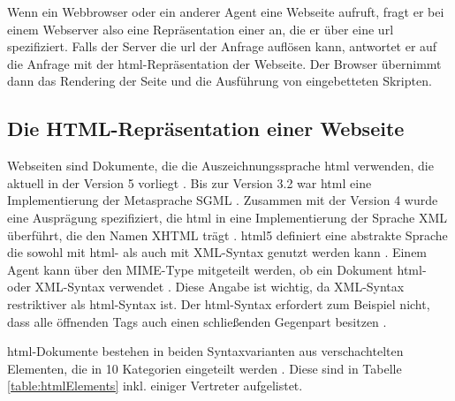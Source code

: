         Wenn ein Webbrowser oder ein anderer Agent eine Webseite aufruft,
        fragt er bei einem Webserver also eine Repräsentation
        einer {\resource} an, die er über eine \gls{url} spezifiziert.
        Falls der Server die \gls{url} der Anfrage auflösen kann,
        antwortet er auf die Anfrage mit der \acrshort{html}-Repräsentation der Webseite.
        Der Browser übernimmt dann das Rendering der Seite und die Ausführung
        von eingebetteten Skripten.

        \subsection{Die HTML-Repräsentation einer Webseite}
            Webseiten sind Dokumente, die die Auszeichnungssprache \gls{html} verwenden,
            die aktuell in der Version 5 vorliegt \cite{w3c:html5}.
            Bis zur Version 3.2 war \gls{html} eine Implementierung der Metasprache SGML \cite[Kapitel 3]{w3c:html401}.
            Zusammen mit der Version 4 wurde eine Ausprägung spezifiziert,
            die \gls{html} in eine Implementierung der Sprache XML überführt,
            die den Namen XHTML trägt \cite{w3c:xhtml}.
            \gls{html}5 definiert eine abstrakte Sprache
            die sowohl mit \gls{html}- als auch mit XML-Syntax genutzt werden kann
            \cite[Kapitel 1.6]{w3c:html5}.
            Einem Agent kann über den MIME-Type mitgeteilt werden,
            ob ein Dokument \gls{html}- oder XML-Syntax verwendet \cite[Kapitel 1.6]{w3c:html5}.
            Diese Angabe ist wichtig, da XML-Syntax restriktiver als \gls{html}-Syntax ist.
            Der \gls{html}-Syntax erfordert zum Beispiel nicht,
            dass alle öffnenden Tags auch einen schließenden Gegenpart besitzen
            \cite[Kapitel 3.2.3]{w3c:html5}.

            \gls{html}-Dokumente bestehen in beiden Syntaxvarianten aus verschachtelten
            Elementen, die in 10 Kategorien eingeteilt werden \cite[Kapitel 4]{w3c:html5}.
            Diese sind in Tabelle \ref{table:htmlElements} inkl. einiger Vertreter aufgelistet.

